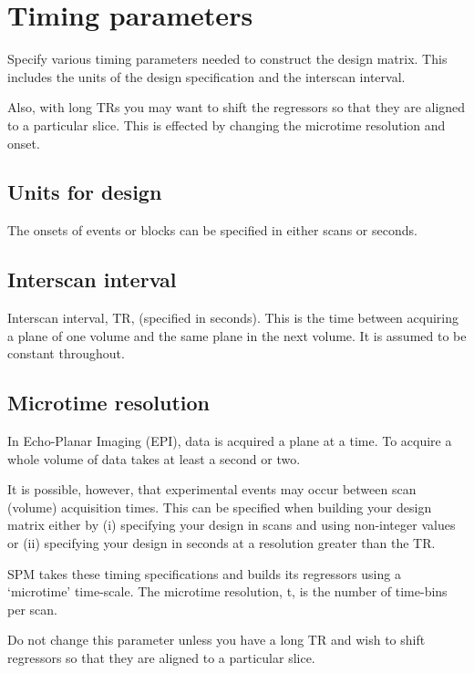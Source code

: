 \section{Timing parameters}
Specify various timing parameters needed to construct the design matrix. This includes the units of the design specification and the interscan interval.

                                                                                                            

Also, with long TRs you may want to shift the regressors so that they are aligned to a particular slice.  This is effected by changing the microtime resolution and onset. 


\subsection{Units for design}
The onsets of events or blocks can be specified in either scans or seconds.


\subsection{Interscan interval}
Interscan interval, TR, (specified in seconds).  This is the time between acquiring a plane of one volume and the same plane in the next volume.  It is assumed to be constant throughout.


\subsection{Microtime resolution}

In Echo-Planar Imaging (EPI), data is acquired a plane
at a time. To acquire a whole volume of data takes at least a second or two.

It is possible, however, that 
experimental events may occur
between scan (volume) acquisition times. This can be specified when building your design matrix either by (i) specifying your design in scans and using non-integer values  or (ii) specifying your design in seconds at a 
resolution greater than the TR.

SPM takes these timing specifications and builds its 
regressors using a `microtime' time-scale. The microtime resolution, t, is the number of time-bins per scan. 

Do not change this parameter unless you have a long TR and wish to shift regressors so that they are aligned to a particular slice. 


